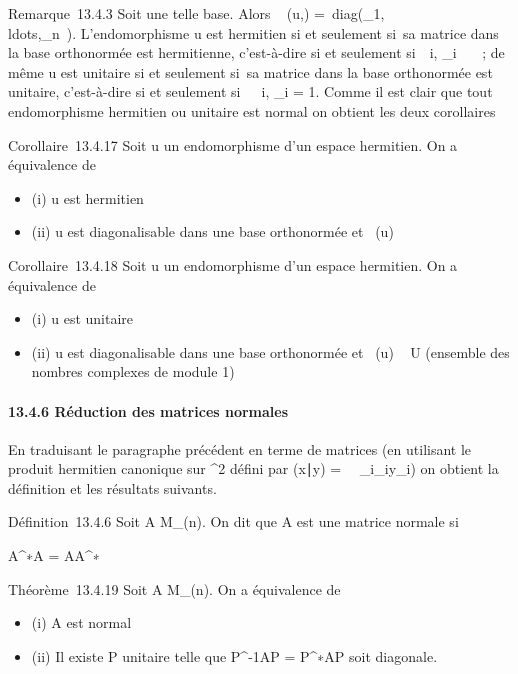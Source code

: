\documentclass[]{article}
\begin{document}
Remarque~13.4.3 Soit  une telle base. Alors
\mathrmMat~ (u,)
=\
diag(\lambda_1,\\ldots,\lambda_n~).
L'endomorphisme u est hermitien si et seulement si~sa matrice dans la
base orthonormée \mathcal{E} est hermitienne, c'est-à-dire si et seulement
si~\forall~i, \lambda_i~ \in \mathbb{R}~~; de même u est
unitaire si et seulement si~sa matrice dans la base orthonormée  est
unitaire, c'est-à-dire si et seulement si~\forall~~i,
\lambda_i = 1. Comme il est clair que tout
endomorphisme hermitien ou unitaire est normal on obtient les deux
corollaires

Corollaire~13.4.17 Soit u un endomorphisme d'un espace hermitien. On a
équivalence de

\begin{itemize}
\itemsep1pt\parskip0pt
\item
  (i) u est hermitien
\item
  (ii) u est diagonalisable dans une base orthonormée et
  ~(u) \subset~ ~
\end{itemize}

Corollaire~13.4.18 Soit u un endomorphisme d'un espace hermitien. On a
équivalence de

\begin{itemize}
\itemsep1pt\parskip0pt
\item
  (i) u est unitaire
\item
  (ii) u est diagonalisable dans une base orthonormée et
  ~(u) \subset~ U
  (ensemble des nombres complexes de module 1)
\end{itemize}

\paragraph{13.4.6 Réduction des matrices normales}

En traduisant le paragraphe précédent en terme de matrices (en utilisant
le produit hermitien canonique sur \mathbb{C}^2 défini par
(x∣y) =\
\sum ~
_i\overlinex_iy_i) on
obtient la définition et les résultats suivants.

Définition~13.4.6 Soit A \in M_(n). On dit que A est une matrice
normale si

A^∗A = AA^∗

Théorème~13.4.19 Soit A \in M_(n). On a équivalence de

\begin{itemize}
\itemsep1pt\parskip0pt
\item
  (i) A est normal
\item
  (ii) Il existe P unitaire telle que P^-1AP =
  P^∗AP soit diagonale.
\end{itemize}
\end{document}
